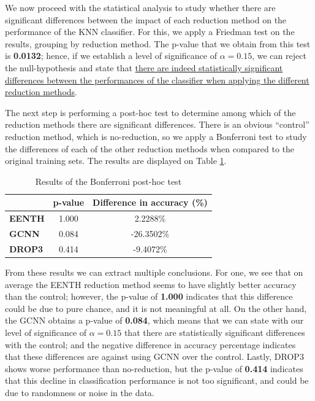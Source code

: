 We now proceed with the statistical analysis to study whether there are significant differences between the impact of each reduction method on the performance of the KNN classifier. For this, we apply a Friedman test on the results, grouping by reduction method. The p-value that we obtain from this test is \textbf{0.0132}; hence, if we establish a level of significance of $ \alpha = 0.15 $, we can reject the null-hypothesis and state that \uline{there are indeed statistically significant differences between the performances of the classifier when applying the different reduction methods}.

The next step is performing a post-hoc test to determine among which of the reduction methods there are significant differences. There is an obvious ``control'' reduction method, which is no-reduction, so we apply a Bonferroni test to study the differences of each of the other reduction methods when compared to the original training sets. The results are displayed on Table \ref{tab:knn:hep:red-posthoc}.

\begin{table}[h!]
    \centering
    \small
    \begin{tabular}{|l|c|c|}
    \hline
                             & \textbf{p-value} & \textbf{Difference in accuracy (\%)} \\ \hline
    \textbf{EENTH} & 1.000           & 2.2288\%          \\ \hline
    \textbf{GCNN}           & 0.084           & -26.3502\%          \\ \hline
    \textbf{DROP3}           & 0.414           & -9.4072\%          \\ \hline
    \end{tabular}
    \caption{Results of the Bonferroni post-hoc test}
    \label{tab:knn:hep:red-posthoc}
\end{table}

From these results we can extract multiple conclusions. For one, we see that on average the EENTH reduction method seems to have slightly better accuracy than the control; however, the p-value of \textbf{1.000} indicates that this difference could be due to pure chance, and it is not meaningful at all. On the other hand, the GCNN obtains a p-value of \textbf{0.084}, which means that we can state with our level of significance of $ \alpha = 0.15 $ that there are statistically significant differences with the control; and the negative difference in accuracy percentage indicates that these differences are against using GCNN over the control. Lastly, DROP3 shows worse performance than no-reduction, but the p-value of \textbf{0.414} indicates that this decline in classification performance is not too significant, and could be due to randomness or noise in the data.

